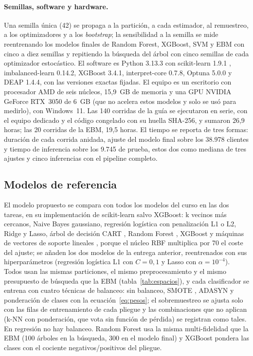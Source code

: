 \paragraph{Semillas, software y hardware.}
Una semilla única (42) se propaga a la partición, a cada estimador, al remuestreo, a los optimizadores y a
los \emph{bootstrap}; la sensibilidad a la semilla se mide reentrenando los modelos finales de Random
Forest, XGBoost, SVM y EBM con cinco a diez semillas y repitiendo la búsqueda del árbol con cinco semillas de
cada optimizador estocástico. El software es Python 3.13.3 con scikit-learn 1.9.1 \citep{pedregosa2011sklearn},
imbalanced-learn 0.14.2, XGBoost 3.4.1, interpret-core 0.7.8, Optuna 5.0.0 y DEAP 1.4.4, con las versiones
exactas fijadas. El equipo es un escritorio con procesador AMD de seis núcleos, 15,9~GB de memoria y una GPU
NVIDIA GeForce RTX~3050 de 6~GB (que no acelera estos modelos y solo se usó para medirlo), con Windows~11.
Las 140 corridas de la guía se ejecutaron en serie, con el equipo dedicado y el código congelado con su huella
SHA-256, y sumaron 26,9 horas; las 20 corridas de la EBM, 19,5 horas. El tiempo se reporta de tres formas:
duración de cada corrida anidada, ajuste del modelo final sobre los 38.978 clientes y tiempo de inferencia
sobre los 9.745 de prueba, estos dos como mediana de tres ajustes y cinco inferencias con el pipeline
completo.

\subsection{Modelos de referencia}
\label{sec:referencias}

\begin{sloppypar}
El modelo propuesto se compara con todos los modelos del curso en las dos tareas, en su implementación de
scikit-learn \citep{pedregosa2011sklearn} salvo XGBoost: k vecinos más cercanos, Naive
Bayes gaussiano, regresión logística con penalización L1 o L2, Ridge y Lasso,
árbol de decisión CART \citep{breiman1984cart}, Random Forest \citep{breiman2001rf}, XGBoost
\citep{chen2016xgboost} y máquinas de vectores de soporte lineales \citep{cortes1995svm}, porque el núcleo
RBF multiplica por 70 el coste del ajuste; se añaden los dos modelos de la entrega anterior, reentrenados con
sus hiperparámetros (regresión logística L1 con $C = 0{,}1$ y Lasso con $\alpha = 10^{-4}$). Todos usan las
mismas particiones, el mismo preprocesamiento y el mismo presupuesto de búsqueda que la EBM
(tabla~\ref{tab:espacios}), y cada clasificador se entrena con cuatro técnicas de balanceo: sin balanceo,
SMOTE \citep{chawla2002smote}, ADASYN y ponderación de clases con la ecuación~\eqref{eq:pesos}; el
sobremuestreo se ajusta solo con las filas de entrenamiento de cada pliegue y las combinaciones que no
aplican (k-NN con ponderación, que vota sin función de pérdida) se registran como tales. En regresión no hay
balanceo. Random Forest usa la misma multi-fidelidad que la EBM (100 árboles en la búsqueda, 300 en el modelo
final) y XGBoost pondera las clases con el cociente negativos/positivos del pliegue.
\end{sloppypar}

